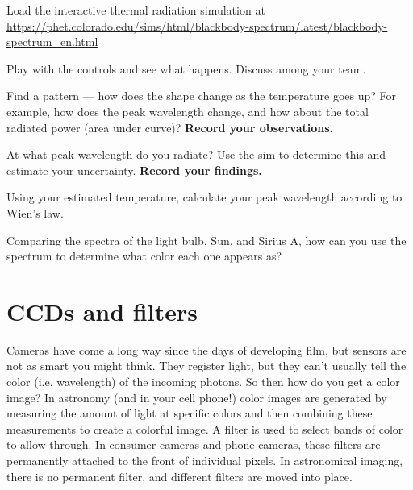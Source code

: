 \begin{steps}
	\item\label{ic:step:load-sim} Load the interactive thermal radiation simulation at \url{https://phet.colorado.edu/sims/html/blackbody-spectrum/latest/blackbody-spectrum_en.html}
	
	\item Play with the controls and see what happens. Discuss among your team.
	
	\item Find a pattern --- how does the shape change as the temperature goes up? For example, how does the peak wavelength change, and how about the total radiated power (area under curve)? \textbf{Record your observations.}
	
	\item At what peak wavelength do you radiate? Use the sim to determine this and estimate your uncertainty. \textbf{Record your findings.}
	
	\item Using your estimated temperature, calculate your peak wavelength according to Wien's law.
	
	\item\label{ic:step:qual-color} Comparing the spectra of the light bulb, Sun, and Sirius A, how can you use the spectrum to determine what color each one appears as?
\end{steps}

\section{CCDs and filters}

Cameras have come a long way since the days of developing film, but sensors are not as smart you might think. They register light, but they can't usually tell the color (i.e. wavelength) of the incoming photons. So then how do you get a color image? In astronomy (and in your cell phone!) color images are generated by measuring the amount of light at specific colors and then combining these measurements to create a colorful image. A filter is used to select bands of color to allow through. In consumer cameras and phone cameras, these filters are permanently attached to the front of individual pixels. In astronomical imaging, there is no permanent filter, and different filters are moved into place.

